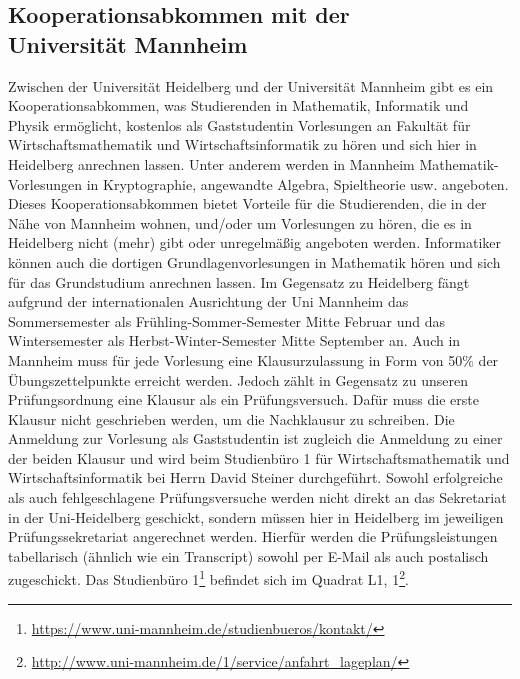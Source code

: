 \subsection{Kooperationsabkommen mit der \\Universität Mannheim}
Zwischen der Universität Heidelberg und der Universität Mannheim gibt es ein Kooperationsabkommen, was Studierenden in Mathematik, Informatik und Physik ermöglicht, kostenlos als Gaststudentin Vorlesungen an Fakultät für Wirtschaftsmathematik und Wirtschaftsinformatik zu hören und sich hier in Heidelberg anrechnen lassen. Unter anderem werden in Mannheim Mathematik-Vorlesungen in Kryptographie, angewandte Algebra, Spieltheorie usw. angeboten. Dieses Kooperationsabkommen bietet Vorteile für die Studierenden, die in der Nähe von Mannheim wohnen, und/oder um Vorlesungen zu hören, die es in Heidelberg nicht (mehr) gibt oder unregelmäßig angeboten werden. Informatiker können auch die dortigen Grundlagenvorlesungen in Mathematik hören und sich für das Grundstudium anrechnen lassen. Im Gegensatz zu Heidelberg fängt aufgrund der internationalen Ausrichtung der Uni Mannheim das Sommersemester als Frühling-Sommer-Semester Mitte Februar und das Wintersemester als Herbst-Winter-Semester Mitte September an. Auch in Mannheim muss für jede Vorlesung eine Klausurzulassung in Form von 50\% der Übungszettelpunkte erreicht werden. Jedoch zählt in Gegensatz zu unseren Prüfungsordnung eine Klausur als ein Prüfungsversuch. Dafür muss die erste Klausur nicht geschrieben werden, um die Nachklausur zu schreiben. Die Anmeldung zur Vorlesung als Gaststudentin ist zugleich die Anmeldung zu einer der beiden Klausur und wird beim Studienbüro 1 für Wirtschaftsmathematik und Wirtschaftsinformatik bei Herrn David Steiner durchgeführt. Sowohl erfolgreiche als auch fehlgeschlagene Prüfungsversuche werden nicht direkt an das Sekretariat in der Uni-Heidelberg geschickt, sondern müssen hier in Heidelberg im jeweiligen Prüfungssekretariat angerechnet werden. Hierfür werden die Prüfungsleistungen tabellarisch (ähnlich wie ein Transcript) sowohl per E-Mail als auch postalisch zugeschickt. Das Studienbüro 1\footnote{\url{https://www.uni-mannheim.de/studienbueros/kontakt/}} befindet sich im Quadrat L1, 1\footnote{\url{http://www.uni-mannheim.de/1/service/anfahrt_lageplan/}}. 
